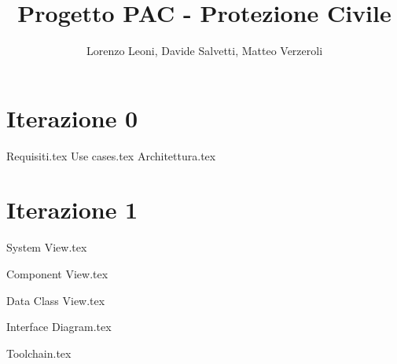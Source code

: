 \documentclass[
a4paper,
cleardoublepage=empty,
headings=twolinechapter,
numbers=autoenddot,
]{scrbook}
\title{Progetto PAC - Protezione Civile}
\author{Lorenzo Leoni, Davide Salvetti, Matteo Verzeroli}
\begin{document}
	\maketitle
	\tableofcontents
	
	\mainmatter
	\chapter{Iterazione 0}

	{Requisiti.tex}
	{Use cases.tex}
	{Architettura.tex}
	\clearpage
	
	\chapter{Iterazione 1}
	{System View.tex}
	
	\clearpage
	
	{Component View.tex}
	
	\clearpage
	
	{Data Class View.tex}
	
	\clearpage
	
	{Interface Diagram.tex}
	
	\clearpage
	
	{Toolchain.tex}
\end{document}

